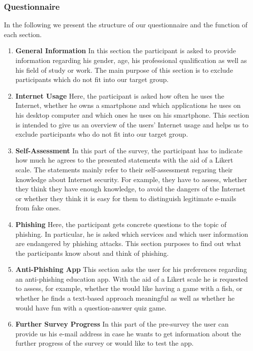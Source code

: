 \subsubsection{Questionnaire}
In the following we present the structure of our questionnaire and the function of each section.
\begin{enumerate}
	\item \textbf{General Information} In this section the participant is asked to provide information regarding his gender, age, his professional qualification as well as his field of study or work. The main purpose of this section is to exclude participants which do not fit into our target group.
	\item \textbf{Internet Usage} Here, the participant is asked how often he uses the Internet, whether he owns a smartphone and which applications he uses on his desktop computer and which ones he uses on his smartphone. This section is intended to give us an overview of the users' Internet usage and helps us to exclude participants who do not fit into our target group.
	\item \textbf{Self-Assessment} In this part of the survey, the participant has to indicate how much he agrees to the presented statements with the aid of a Likert scale. The statements mainly refer to their self-assessment regaring their knowledge about Internet security. For example, they have to assess, whether they think they have enough knowledge, to avoid the dangers of the Internet or whether they think it is easy for them to distinguish legitimate e-mails from fake ones.
	\item \textbf{Phishing} Here, the participant gets concrete questions to the topic of phishing. In particular, he is asked which services and which user information are endangered by phishing attacks. This section purposes to find out what the participants know about and think of phishing.
	\item \textbf{Anti-Phishing App} This section asks the user for his preferences regarding an anti-phishing education app. With the aid of a Likert scale he is requested to assess, for example, whether the would like having a game with a fish, or whether he finds a text-based approach meaningful as well as whether he would have fun with a question-answer quiz game.
	\item \textbf{Further Survey Progress} In this part of the pre-survey the user can provide us his e-mail address in case he wants to get information about the further progress of the survey or would like to test the app.
\end{enumerate}

